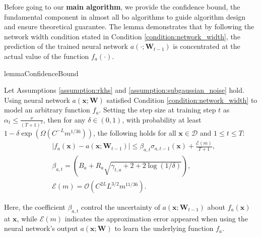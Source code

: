 Before going to our \textbf{main algorithm}, we provide the confidence bound, the fundamental component in almost all \ac{bo} algorithms to guide algorithm design and ensure theoretical guarantee. The lemma demonstrates that by following the network width condition stated in Condition \ref{condition:network_width},  the prediction of the trained neural network $a(\cdot;\mathbf{W}_{t-1})$ is concentrated at the actual value of the function $f_a(\cdot)$. 
\begin{restatable}{lemma}{ConfidenceBound}

\label{lemma:neural-cbo_confidence_bound}
Let Assumptions \ref{assumption:rkhs} and \ref{assumption:subgaussian_noise} hold. Using neural network $a(\mathbf{x}; \mathbf{W})$ satisfied Condition \ref{condition:network_width} to model an arbitrary function $f_a$. Setting the step size at training step $t$ as $\alpha_t \le \frac{\nu}{(T+1)^2}$, then for any $\delta \in (0,1)$,  with probability at least $1 - \delta \exp (\Omega(C^{-L} m^{1/36}))$, the following holds for all $\mathbf{x} \in \mathcal{D}$ and $1 \le t \le T$:
\begin{align*}
     & \lvert f_a(\mathbf{x}) - a(\mathbf{x}; \mathbf{W}_{t-1}) \rvert 
    \le \beta_{a,t} \sigma_{a, t-1}(\mathbf{x}) + \frac{\mathcal{E}(m)}{T+1},
    \\
    & \beta_{a,t} = \left(B_a + R_a \sqrt{\gamma_{t,a} + 2 + 2 \log(1/\delta)}\right),
    \\
    & \mathcal{E}(m) = \mathcal{O}(C^{2L} L^{3/2} m^{11/36}).
\end{align*}
\end{restatable}
Here, the coefficient $\beta_{a,t}$ control the uncertainty of $a(\mathbf{x}; \mathbf{W}_{t-1})$ about $f_a(\mathbf{x})$ at $\mathbf{x}$, while $ \mathcal{E}(m)$ indicates the approximation error appeared when using the neural network's output $a(\mathbf{x}; \boldsymbol{W})$ to learn the underlying function $f_a$.     

